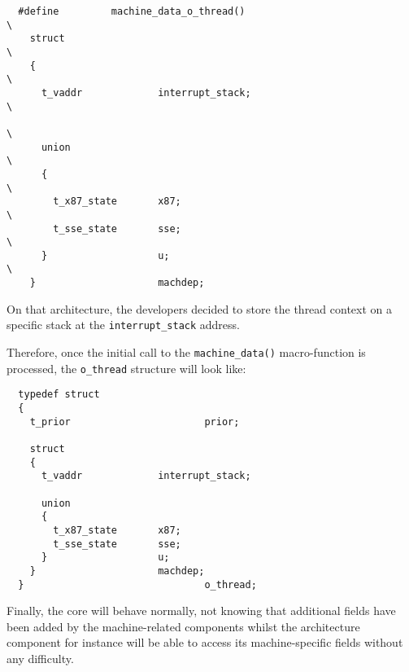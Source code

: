 \begin{verbatim}
  #define         machine_data_o_thread()                                 \
    struct                                                                \
    {                                                                     \
      t_vaddr             interrupt_stack;                                \
                                                                          \
      union                                                               \
      {                                                                   \
        t_x87_state       x87;                                            \
        t_sse_state       sse;                                            \
      }                   u;                                              \
    }                     machdep;
\end{verbatim}

On that architecture, the developers decided to store the thread context
on a specific stack at the \texttt{interrupt\_stack} address.

Therefore, once the initial call to the \texttt{machine\_data()} macro-function
is processed, the \texttt{o\_thread} structure will look like:

\begin{verbatim}
  typedef struct
  {
    t_prior                       prior;

    struct
    {
      t_vaddr             interrupt_stack;

      union
      {
        t_x87_state       x87;
        t_sse_state       sse;
      }                   u;
    }                     machdep;
  }                               o_thread;
\end{verbatim}

Finally, the core will behave normally, not knowing that additional fields
have been added by the machine-related components whilst the architecture
component for instance will be able to access its machine-specific fields
without any difficulty.

